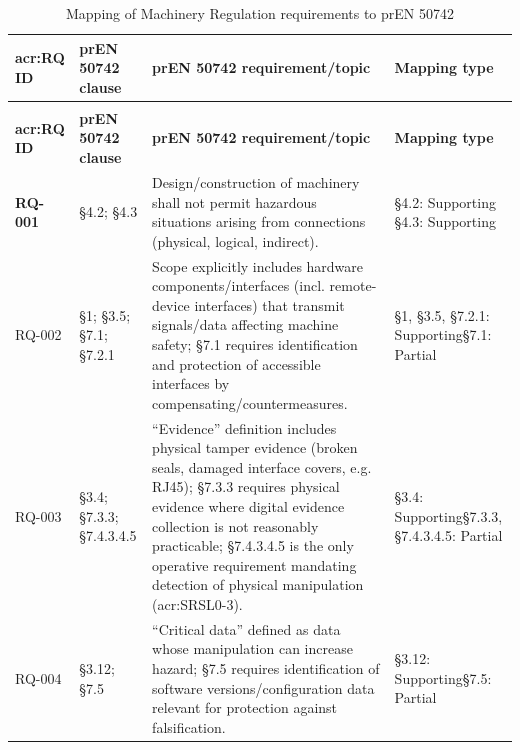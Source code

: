 \begin{longtable}{|>{\bfseries}p{1cm}|p{2.5cm}|p{9cm}|>{\centering\arraybackslash}p{2cm}|}
	\caption{Mapping of Machinery Regulation requirements to prEN 50742} 
	\label{tab:pren50742-mapping} \\
	\hline
	\textbf{\gls{acr:RQ} ID} & \textbf{prEN 50742 clause} & \textbf{prEN 50742 requirement/topic} & \textbf{Mapping type} \\
	\hline
	\endfirsthead
	
	\multicolumn{4}{c}{\tablename\ \thetable{} continued from previous page} \\
	\hline
	\textbf{\gls{acr:RQ} ID} & \textbf{prEN 50742 clause} & \textbf{prEN 50742 requirement/topic} & \textbf{Mapping type} \\
	\hline
	\endhead
	
	\hline
	\endlastfoot
	RQ-001 &
	\S4.2; \newline \S4.3 &
	Design/construction of machinery shall not permit hazardous situations arising from connections (physical, logical, indirect). &
	\S4.2: Supporting \newline\S4.3: Supporting \\
	\hline
	
	
	RQ-002 &
	\S1;  \newline \S3.5;  \newline \S7.1;  \newline \S7.2.1 &
	Scope explicitly includes hardware components/interfaces (incl. remote-device interfaces) that transmit signals/data affecting machine safety; \S7.1 requires identification and protection of accessible interfaces by compensating/countermeasures. &
	\S1, \S3.5, \S7.2.1: Supporting\newline\S7.1: Partial \\
	\hline
	
	RQ-003 &
	\S3.4;  \newline \S7.3.3;  \newline\S7.4.3.4.5 &
	``Evidence'' definition includes physical tamper evidence (broken seals, damaged interface covers, e.g. RJ45); \S7.3.3 requires physical evidence where digital evidence collection is not reasonably practicable; \S7.4.3.4.5 is the only operative requirement mandating detection of physical manipulation (\gls{acr:SRSL}0-3).  &
	\S3.4: Supporting\newline\S7.3.3, \S7.4.3.4.5: Partial \\
	\hline
	
	RQ-004 &
	\S3.12;  \newline\S7.5 &
	``Critical data'' defined as data whose manipulation can increase hazard; \S7.5 requires identification of software versions/configuration data relevant for protection against falsification. &
	\S3.12: Supporting\newline\S7.5: Partial \\
	\hline
	

\end{longtable}
